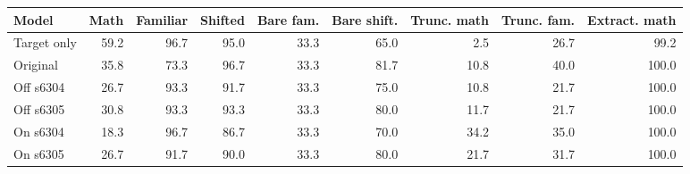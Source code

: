 \scriptsize
\setlength{\tabcolsep}{3.5pt}
\label{tab:t3quality}
\begin{adjustbox}{max width=\linewidth}
\begin{tabular}{lrrrrrrrr}
\toprule
Model & Math & Familiar & Shifted & Bare fam. & Bare shift. & Trunc. math & Trunc. fam. & Extract. math \\
\midrule
Target only & 59.2 & 96.7 & 95.0 & 33.3 & 65.0 & 2.5 & 26.7 & 99.2 \\
Original & 35.8 & 73.3 & 96.7 & 33.3 & 81.7 & 10.8 & 40.0 & 100.0 \\
Off s6304 & 26.7 & 93.3 & 91.7 & 33.3 & 75.0 & 10.8 & 21.7 & 100.0 \\
Off s6305 & 30.8 & 93.3 & 93.3 & 33.3 & 80.0 & 11.7 & 21.7 & 100.0 \\
On s6304 & 18.3 & 96.7 & 86.7 & 33.3 & 70.0 & 34.2 & 35.0 & 100.0 \\
On s6305 & 26.7 & 91.7 & 90.0 & 33.3 & 80.0 & 21.7 & 31.7 & 100.0 \\
\bottomrule
\end{tabular}
\end{adjustbox}
